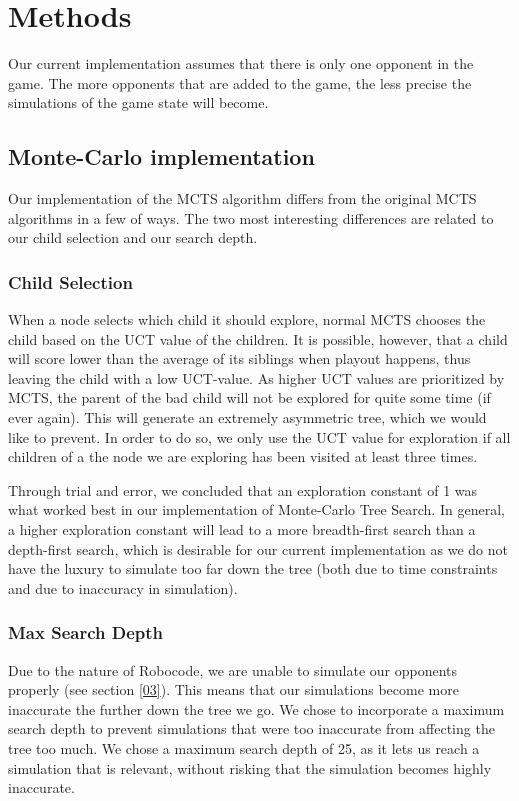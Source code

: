 \section{Methods}
\label{04}
Our current implementation assumes that there is only one opponent in the game. The more opponents that are added to the game, the less precise the simulations of the game state will become.

\subsection{Monte-Carlo implementation}
\label{04_MCTS}

Our implementation of the MCTS algorithm differs from the original MCTS algorithms in a few of ways. The two most interesting differences are related to our child selection and our search depth.

\subsubsection{Child Selection}
When a node selects which child it should explore, normal MCTS chooses the child based on the UCT\cite{kocsis2006bandit} value of the children. It is possible, however, that a child will score lower than the average of its siblings when playout happens, thus leaving the child with a low UCT-value. As higher UCT values are prioritized by MCTS, the parent of the bad child will not be explored for quite some time (if ever again). This will generate an extremely asymmetric tree, which we would like to prevent. In order to do so, we only use the UCT value for exploration if all children of a the node we are exploring has been visited at least three times.

Through trial and error, we concluded that an exploration constant of 1 was what worked best in our implementation of Monte-Carlo Tree Search. In general, a higher exploration constant will lead to a more breadth-first search than a depth-first search, which is desirable for our current implementation as we do not have the luxury to simulate too far down the tree (both due to time constraints and due to inaccuracy in simulation).

\subsubsection{Max Search Depth}
Due to the nature of Robocode, we are unable to simulate our opponents properly (see section \ref{03}). This means that our simulations become more inaccurate the further down the tree we go. We chose to incorporate a maximum search depth to prevent simulations that were too inaccurate from affecting the tree too much. We chose a maximum search depth of 25, as it lets us reach a simulation that is relevant, without risking that the simulation becomes highly inaccurate.

